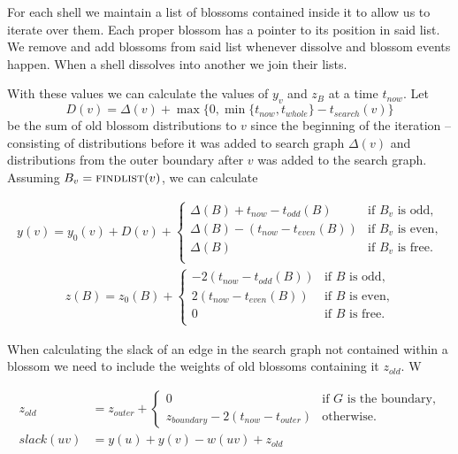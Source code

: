 For each shell we maintain a list of blossoms contained inside it to allow us to iterate over them. Each proper blossom has a pointer to its position in said list. We remove and add blossoms from said list whenever dissolve and blossom events happen. When a shell dissolves into another we join their lists.

With these values we can calculate the values of $y_v$ and $z_B$ at a time $t_{now}$. Let 
\[ D(v) = \Delta(v) + \max\{0, \min\{t_{now}, t_{whole}\} - t_{search}(v)\} \] 
be the sum of old blossom distributions to $v$ since the beginning of the iteration – consisting of distributions before it was added to search graph $\Delta(v)$ and distributions from the outer boundary after $v$ was added to the search graph. Assuming $B_v = \textsc{findlist}(v)$, we can calculate

\begin{align*}
    y(v) = y_0(v) + D(v) + 
    \begin{cases}
        \Delta(B) + t_{now} - t_{odd}(B) & \text{if $B_v$ is odd,} \\
        \Delta(B) - (t_{now} - t_{even}(B)) & \text{if $B_v$ is even,} \\
        \Delta(B) & \text{if $B_v$ is free.} \\
    \end{cases}
\end{align*}
\begin{align*}
    z(B) = z_0(B) + 
    \begin{cases}
        -2(t_{now} - t_{odd}(B)) & \text{if $B$ is odd,} \\
        2(t_{now} - t_{even}(B)) & \text{if $B$ is even,} \\
        0 & \text{if $B$ is free.} \\
    \end{cases}
\end{align*}

When calculating the slack of an edge in the search graph not contained within a blossom we need to include the weights of old blossoms containing it $z_{old}$. W

\begin{align*}
    z_{old} &= z_{outer} + \begin{cases}
        0 & \text{if $G$ is the boundary,} \\
        z_{boundary} - 2(t_{now} - t_{outer}) & \text{otherwise.}
    \end{cases} \\
    slack(uv) &= y(u) + y(v) - w(uv) + z_{old}
\end{align*}

